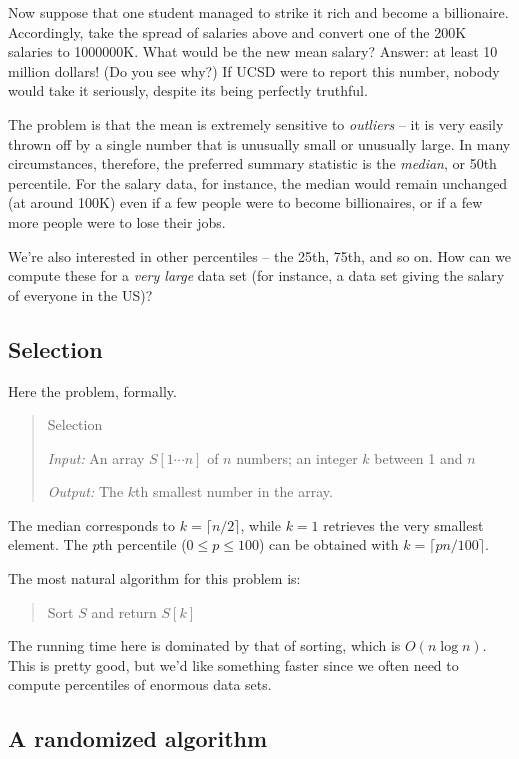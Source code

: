 Now suppose that one student managed to strike it rich and become a billionaire. 
Accordingly, take the spread of salaries above and convert one of the 200K salaries 
to 1000000K. What would be the new mean salary? Answer: at least 10 million dollars! 
(Do you see why?) If UCSD were to report this number, nobody would take it seriously,
despite its being perfectly truthful.

The problem is that the mean is extremely sensitive to {\it outliers} -- it is very 
easily thrown off by a single number that is unusually small or unusually large. In
many circumstances, therefore, the preferred summary statistic is the {\it median}, 
or 50th percentile. For the salary data, for instance, the median would remain 
unchanged (at around 100K) even if a few people were to become billionaires, or if 
a few more people were to lose their jobs.

We're also interested in other percentiles -- the 25th, 75th, and so on. How can
we compute these for a {\it very large} data set (for instance, a data set giving 
the salary of everyone in the US)?

\subsection{Selection}

Here the problem, formally.

\begin{quote}
{\sc Selection}

{\it Input:} An array $S[1\cdots n]$ of $n$ numbers; an integer $k$ between 1 and $n$

{\it Output:} The $k$th smallest number in the array.
\end{quote}
The median corresponds to $k= \lceil n/2 \rceil$, while $k=1$ retrieves the very 
smallest element. The $p$th percentile ($0 \leq p \leq 100$) can be obtained with 
$k = \lceil pn/100 \rceil$.

The most natural algorithm for this problem is:
\begin{quote}
Sort $S$ and return $S[k]$
\end{quote}
The running time here is dominated by that of sorting, which is $O(n \log n)$. This
is pretty good, but we'd like something faster since we often need to compute
percentiles of enormous data sets.

\subsection{A randomized algorithm}

